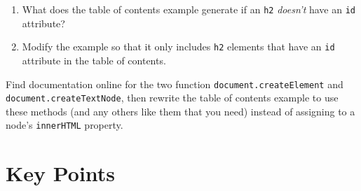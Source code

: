 
\begin{enumerate}
\item
  What does the table of contents example generate if an \texttt{h2} \emph{doesn't} have an \texttt{id} attribute?
\item
  Modify the example so that it only includes \texttt{h2} elements that have an \texttt{id} attribute
  in the table of contents.
\end{enumerate}


Find documentation online for the two function
\texttt{document.createElement} and \texttt{document.createTextNode},
then rewrite the table of contents example to use these methods
(and any others like them that you need)
instead of assigning to a node's \texttt{innerHTML} property.

\section*{Key Points}


